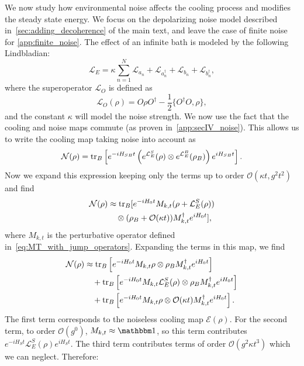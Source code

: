 We now study how environmental noise affects the cooling process and modifies the steady state energy. We focus on the depolarizing noise model described in~\cref{sec:adding_decoherence} of the main text, and leave the case of finite noise for \cref{app:finite_noise}. The effect of an infinite bath is modeled by the following Lindbladian:
\begin{equation}
    \mathcal{L}_E=\kappa\sum_{n=1}^N \mathcal{L}_{a_n}+\mathcal{L}_{a_n^\dag}+\mathcal{L}_{b_n}+\mathcal{L}_{b_n^\dag},
\end{equation}
where the superoperator $\mathcal{L}_{O}$ is defined as
\begin{equation}
    \mathcal{L}_O(\rho) = O\rho O^\dagger - \frac{1}{2}\{O^\dagger O,\rho\},
\end{equation}
and the constant $\kappa$ will model the noise strength. We now use the fact that the cooling and noise maps commute (as proven in~\cref{app:secIV_noise}). This allows us to write the cooling map taking noise into account as
\begin{align}
    \mathcal{N}(\rho)=\operatorname{tr}_B\left[e^{-iH_{SB}t}\left(e^{\mathcal{L}_E^S}(\rho)\otimes e^{\mathcal{L}_E^B}(\rho_B)\right)e^{i H_{SB}t}\right].
\end{align}
Now we expand this expression keeping only the terms up to order $\mathcal{O}(\kappa t,g^2t^2)$ and find
\begin{align}
    \mathcal{N}(\rho) &\approx \operatorname{tr}_B[e^{-iH_{0}t}M_{k,t}(\rho+\mathcal{L}_E^S(\rho))\nonumber\\
                      &\quad\otimes (\rho_B+\mathcal{O}(\kappa t))M_{k,t}^\dag e^{i H_{0}t}],
\end{align}
where $M_{k,t}$ is the perturbative operator defined in~\cref{eq:MT_with_jump_operators}. Expanding the terms in this map, we find
\begin{align}
    \mathcal{N}(\rho)
     &\approx \operatorname{tr}_B\left[e^{-iH_{0}t}M_{k,t}\rho\otimes\rho_B M_{k,t}^\dag e^{i H_{0}t}\right]\nonumber\\
     &\quad + \operatorname{tr}_B\left[e^{-iH_{0}t}M_{k,t}\mathcal{L}_E^S(\rho)\otimes\rho_B M_{k,t}^\dag e^{i H_{0}t}\right]\nonumber\\
     &\quad + \operatorname{tr}_B\left[e^{-iH_{0}t}M_{k,t}\rho\otimes\mathcal{O}(\kappa t) M_{k,t}^\dag e^{i H_{0}t}\right].
\end{align}
The first term corresponds to the noiseless cooling map $\mathcal{E}(\rho)$. For the second term, to order $\mathcal{O}(g^0)$, $M_{k,t} \approx \Id$, so this term contributes $e^{-iH_{S}t}\mathcal{L}_E^S(\rho)e^{i H_{S}t}$. The third term contributes terms of order $\mathcal{O}(g^2\kappa t^3)$ which we can neglect. Therefore:
